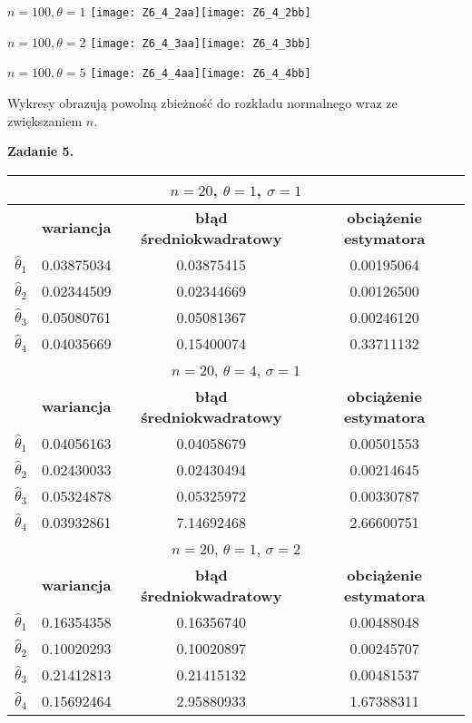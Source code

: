 \documentclass[a4paper]{article}
\begin{document}
\begin{center}
$n=100,\theta=1$
\texttt{[image: Z6\_4\_2aa]}\texttt{[image: Z6\_4\_2bb]} 
\end{center}

\begin{center}
$n=100,\theta=2$
\texttt{[image: Z6\_4\_3aa]}\texttt{[image: Z6\_4\_3bb]} 
\end{center}
\newpage

\begin{center}
$n=100,\theta=5$
\texttt{[image: Z6\_4\_4aa]}\texttt{[image: Z6\_4\_4bb]} 
\end{center}

Wykresy obrazują powolną zbieżność do rozkładu normalnego wraz ze zwiększaniem $n$.
\newline

\textbf{Zadanie 5.}



\begin{table}[H]
\centering
\begin{tabular}{|c|c|c|c|}
\hline
\multicolumn{4}{|c|}{$n=20$, $\theta=1$, $\sigma=1$} \\ \hline
                  & \textbf{wariancja}   & \textbf{błąd średniokwadratowy} & \textbf{obciążenie estymatora} \\ \hline
$\hat{\theta}_1$ & 0.03875034 & 0.03875415 & 0.00195064 \\ \hline
$\hat{\theta}_2$ & 0.02344509 & 0.02344669 & 0.00126500 \\ \hline
$\hat{\theta}_3$ & 0.05080761 & 0.05081367 & 0.00246120 \\ \hline
$\hat{\theta}_4$ & 0.04035669 & 0.15400074 & 0.33711132 \\ \hline
\multicolumn{4}{|c|}{$n=20$, $\theta=4$, $\sigma=1$} \\ \hline
                  & \textbf{wariancja}   & \textbf{błąd średniokwadratowy} & \textbf{obciążenie estymatora} \\ \hline
$\hat{\theta}_1$ & 0.04056163 & 0.04058679 & 0.00501553 \\ \hline
$\hat{\theta}_2$ & 0.02430033 & 0.02430494 & 0.00214645 \\ \hline
$\hat{\theta}_3$ & 0.05324878 & 0.05325972 & 0.00330787 \\ \hline
$\hat{\theta}_4$ & 0.03932861 & 7.14692468 & 2.66600751 \\ \hline
\multicolumn{4}{|c|}{$n=20$, $\theta=1$, $\sigma=2$} \\ \hline
                  & \textbf{wariancja}   & \textbf{błąd średniokwadratowy} & \textbf{obciążenie estymatora} \\ \hline
$\hat{\theta}_1$ & 0.16354358 & 0.16356740 & 0.00488048 \\ \hline
$\hat{\theta}_2$ & 0.10020293 & 0.10020897 & 0.00245707 \\ \hline
$\hat{\theta}_3$ & 0.21412813 & 0.21415132 & 0.00481537 \\ \hline
$\hat{\theta}_4$ & 0.15692464 & 2.95880933 & 1.67388311 \\ \hline
\end{tabular}
\end{table}
\end{document}
